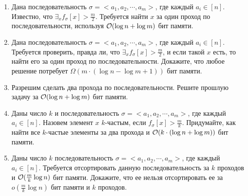 \begin{enumerate}
  \item
    Дана последовательность $\sigma = <a_1, a_2, \cdots, a_m>$,
    где каждый $a_i \in [n]$. Известно, что $\exists_x f_\sigma[x] >
    \frac{m}{2}$. Требуется найти $x$ за один проход по
    последовательности, используя $\mathcal{O}(\log{n} + \log{m})$ бит памяти.

  \item
    Дана последовательность $\sigma = <a_1, a_2, \cdots, a_m>$,
    где каждый $a_i \in [n]$. Требуется проверить, правда ли, что
    $\exists_x f_\sigma[x] > \frac{m}{2}$, и если такой $x$ есть, то
    найти его за один проход по последовательности.
    Докажите, что любое решение потребует $\Omega(m \cdot (\log{n} -
    \log{m} + 1))$ бит памяти.

  \item
    Разрешим сделать два прохода по последовательности. Решите
    прошлую задачу за $\mathcal{O}(\log{n} + \log{m})$ бит памяти.

  \item
    Даны число $k$ и последовательность $\sigma = <a_1, a_2, \cdots, a_m>$,
    где каждый $a_i \in [n]$. Назовем элемент $x$ $k$-частым, если
    $f_\sigma[x] > \frac{m}{k}$. Придумайте, как найти все $k$-частые
    элементы за два прохода и $\mathcal{O}(k \cdot (\log{n} + \log{m}))$ бит памяти.

  \item
    Даны число $k$ последовательность $\sigma = <a_1, a_2, \cdots, a_m>$,
    где каждый $a_i \in [n]$.
    Требуется отсортировать данную последовательность за $k$ проходов
    и $\mathcal{O}(\frac{m}{k} \log{n})$ бит памяти. Докажите, что ее нельзя отсортировать ее
    за $o(\frac{m}{k} \log{n})$ бит памяти и $k$ проходов.

\end{enumerate}

\clearpage
